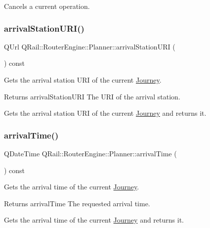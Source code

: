 Cancels a current operation. 

\mbox{\label{classQRail_1_1RouterEngine_1_1Planner_ad9d45f498635d0310c699d9154c68b38}} 
\subsubsection{\texorpdfstring{arrivalStationURI()}{arrivalStationURI()}}
{\footnotesize\ttfamily Q\+Url Q\+Rail\+::\+Router\+Engine\+::\+Planner\+::arrival\+Station\+U\+RI (\begin{DoxyParamCaption}{ }\end{DoxyParamCaption}) const}



Gets the arrival station U\+RI of the current \mbox{\hyperlink{classQRail_1_1RouterEngine_1_1Journey}{Journey}}. 

\begin{DoxyReturn}{Returns}
arrival\+Station\+U\+RI The U\+RI of the arrival station.
\end{DoxyReturn}
Gets the arrival station U\+RI of the current \mbox{\hyperlink{classQRail_1_1RouterEngine_1_1Journey}{Journey}} and returns it. \mbox{\label{classQRail_1_1RouterEngine_1_1Planner_adf7dbcaa92080558d1146422967d2cde}} 
\subsubsection{\texorpdfstring{arrivalTime()}{arrivalTime()}}
{\footnotesize\ttfamily Q\+Date\+Time Q\+Rail\+::\+Router\+Engine\+::\+Planner\+::arrival\+Time (\begin{DoxyParamCaption}{ }\end{DoxyParamCaption}) const}



Gets the arrival time of the current \mbox{\hyperlink{classQRail_1_1RouterEngine_1_1Journey}{Journey}}. 

\begin{DoxyReturn}{Returns}
arrival\+Time The requested arrival time.
\end{DoxyReturn}
Gets the arrival time of the current \mbox{\hyperlink{classQRail_1_1RouterEngine_1_1Journey}{Journey}} and returns it. \mbox{\label{classQRail_1_1RouterEngine_1_1Planner_a2a6a93bae30063f03c439c8761e462fa}} 
